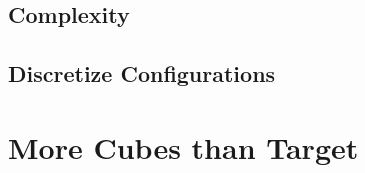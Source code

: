 \subsection{Complexity}


\subsection{Discretize Configurations}





\section{More Cubes than Target}
\label{sec:more_cubes}

